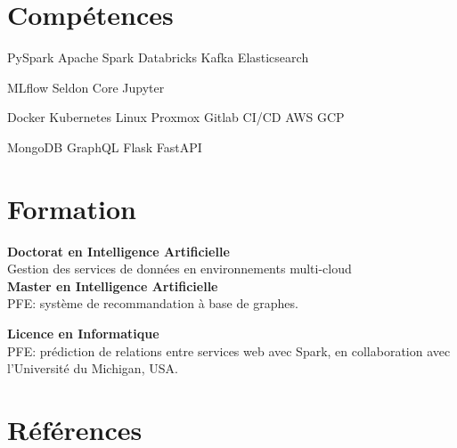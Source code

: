 \documentclass[french]{plushcv}
\begin{document}
\begin{minipage}[t]{0.23\textwidth}

\section{Compétences}

PySpark \textbullet{} Apache Spark \textbullet{} Databricks \textbullet{} Kafka \textbullet{} Elasticsearch \\
\sectionsep

MLflow \textbullet{} Seldon Core \textbullet{} Jupyter \\
\sectionsep

Docker \textbullet{} Kubernetes \textbullet{} Linux \textbullet{} Proxmox \textbullet{} Gitlab CI/CD \textbullet{} AWS \textbullet{} GCP \\
\sectionsep

MongoDB \textbullet{} GraphQL \textbullet{} Flask \textbullet{} FastAPI \\

\sectionsep

\section{Formation}
\sectionsep
\sectionsep

\textbf{Doctorat en Intelligence Artificielle} \\
Gestion des services de données en environnements multi-cloud \\

\sectionsep
\textbf{Master en Intelligence Artificielle} \\
PFE: système de recommandation à base de graphes.

\sectionsep
\textbf{Licence en Informatique} \\
PFE: prédiction de relations entre services web avec Spark, en collaboration avec l'Université du Michigan, USA.
\sectionsep

\section{Références}


\end{minipage}
\end{document}
